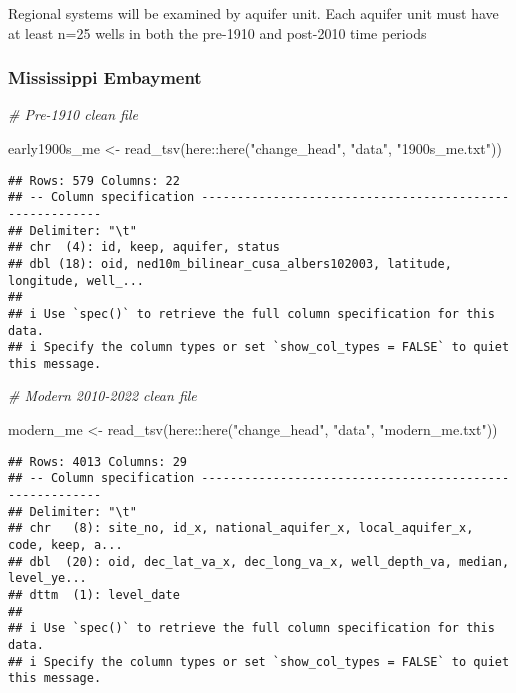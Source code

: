 \documentclass[
]{article}
\newenvironment{Shaded}{\begin{snugshade}}{\end{snugshade}}
\newcommand{\CommentTok}[1]{\textcolor[rgb]{0.56,0.35,0.01}{\textit{#1}}}
\newcommand{\FunctionTok}[1]{\textcolor[rgb]{0.00,0.00,0.00}{#1}}
\newcommand{\NormalTok}[1]{#1}
\newcommand{\OtherTok}[1]{\textcolor[rgb]{0.56,0.35,0.01}{#1}}
\newcommand{\SpecialCharTok}[1]{\textcolor[rgb]{0.00,0.00,0.00}{#1}}
\newcommand{\StringTok}[1]{\textcolor[rgb]{0.31,0.60,0.02}{#1}}
\begin{document}
Regional systems will be examined by aquifer unit. Each aquifer unit
must have at least n=25 wells in both the pre-1910 and post-2010 time
periods

\hypertarget{mississippi-embayment}{%
\subsubsection{Mississippi Embayment}\label{mississippi-embayment}}

\begin{Shaded}
\begin{Highlighting}[]
\CommentTok{\# Pre{-}1910 clean file }

\NormalTok{early1900s\_me }\OtherTok{\textless{}{-}} \FunctionTok{read\_tsv}\NormalTok{(here}\SpecialCharTok{::}\FunctionTok{here}\NormalTok{(}\StringTok{"change\_head"}\NormalTok{, }\StringTok{"data"}\NormalTok{, }\StringTok{"1900s\_me.txt"}\NormalTok{))}
\end{Highlighting}
\end{Shaded}

\begin{verbatim}
## Rows: 579 Columns: 22
## -- Column specification --------------------------------------------------------
## Delimiter: "\t"
## chr  (4): id, keep, aquifer, status
## dbl (18): oid, ned10m_bilinear_cusa_albers102003, latitude, longitude, well_...
## 
## i Use `spec()` to retrieve the full column specification for this data.
## i Specify the column types or set `show_col_types = FALSE` to quiet this message.
\end{verbatim}

\begin{Shaded}
\begin{Highlighting}[]
\CommentTok{\# Modern 2010{-}2022 clean file }

\NormalTok{modern\_me }\OtherTok{\textless{}{-}} \FunctionTok{read\_tsv}\NormalTok{(here}\SpecialCharTok{::}\FunctionTok{here}\NormalTok{(}\StringTok{"change\_head"}\NormalTok{, }\StringTok{"data"}\NormalTok{, }\StringTok{"modern\_me.txt"}\NormalTok{))}
\end{Highlighting}
\end{Shaded}

\begin{verbatim}
## Rows: 4013 Columns: 29
## -- Column specification --------------------------------------------------------
## Delimiter: "\t"
## chr   (8): site_no, id_x, national_aquifer_x, local_aquifer_x, code, keep, a...
## dbl  (20): oid, dec_lat_va_x, dec_long_va_x, well_depth_va, median, level_ye...
## dttm  (1): level_date
## 
## i Use `spec()` to retrieve the full column specification for this data.
## i Specify the column types or set `show_col_types = FALSE` to quiet this message.
\end{verbatim}
\end{document}
